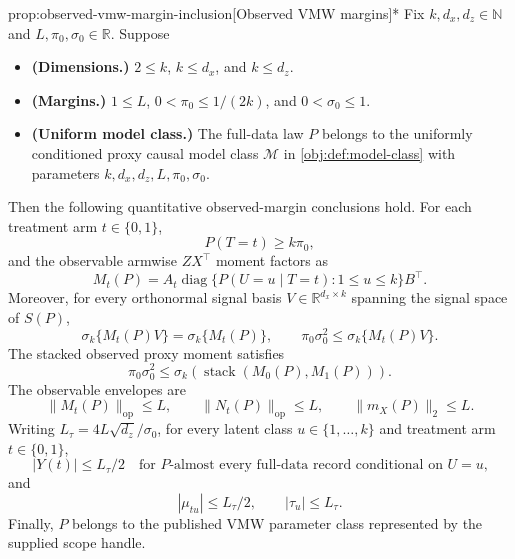 \documentclass[11pt]{article}
\begin{document}
\begin{propositionv}{prop:observed-vmw-margin-inclusion}[Observed VMW margins]*
Fix \(k,d_x,d_z\in\mathbb N\) and \(L,\pi_0,\sigma_0\in\mathbb R\).  Suppose
\begin{itemize}
\item \textbf{(Dimensions.)} \(2\le k\), \(k\le d_x\), and \(k\le d_z\).
\item \textbf{(Margins.)} \(1\le L\), \(0<\pi_0\le 1/(2k)\), and \(0<\sigma_0\le 1\).
\item \textbf{(Uniform model class.)} The full-data law \(P\) belongs to the uniformly conditioned proxy causal model class \(\mathcal M\) in \cref{obj:def:model-class} with parameters \(k,d_x,d_z,L,\pi_0,\sigma_0\).
\end{itemize}
Then the following quantitative observed-margin conclusions hold.  For each treatment arm \(t\in\{0,1\}\),
\[
P(T=t)\ge k\pi_0,
\]
and the observable armwise \(ZX^\top\) moment factors as
\[
M_t(P)
=
A_t\operatorname{diag}\{P(U=u\mid T=t):1\le u\le k\}B^\top .
\]
Moreover, for every orthonormal signal basis \(V\in\mathbb R^{d_x\times k}\) spanning the signal space of \(S(P)\),
\[
\sigma_k\{M_t(P)V\}
=
\sigma_k\{M_t(P)\},
\qquad
\pi_0\sigma_0^2\le \sigma_k\{M_t(P)V\}.
\]
The stacked observed proxy moment satisfies
\[
\pi_0\sigma_0^2
\le
\sigma_k\!\left(\operatorname{stack}(M_0(P),M_1(P))\right).
\]
The observable envelopes are
\[
\|M_t(P)\|_{\mathrm{op}}\le L,
\qquad
\|N_t(P)\|_{\mathrm{op}}\le L,
\qquad
\|m_X(P)\|_2\le L .
\]
Writing \(L_\tau=4L\sqrt{d_z}/\sigma_0\), for every latent class \(u\in\{1,\ldots,k\}\) and treatment arm \(t\in\{0,1\}\),
\[
|Y(t)|\le L_\tau/2
\quad\text{for \(P\)-almost every full-data record conditional on \(U=u\),}
\]
and
\[
|\mu_{tu}|\le L_\tau/2,
\qquad
|\tau_u|\le L_\tau .
\]
Finally, \(P\) belongs to the published VMW parameter class represented by the supplied scope handle.
\end{propositionv}
\end{document}
